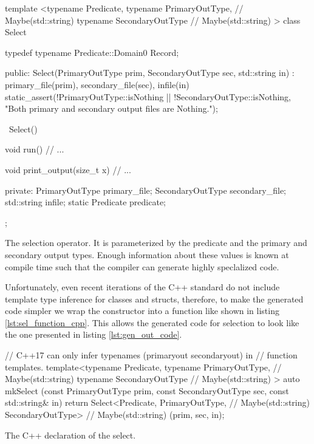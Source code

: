 \begin{code}
\begin{cppcode}
template <typename Predicate,
          typename PrimaryOutType,   // Maybe(std::string)
          typename SecondaryOutType  // Maybe(std::string)
          >
class Select {
  typedef typename Predicate::Domain0 Record;

public:
  Select(PrimaryOutType prim, SecondaryOutType sec, std::string in)
    : primary_file(prim), secondary_file(sec), infile(in) {
    static_assert(!PrimaryOutType::isNothing || !SecondaryOutType::isNothing,
                  "Both primary and secondary output files are Nothing.");
  }

  ~Select() {}

  void run() {
    // ...
  }

  void print_output(size_t x) {
    // ...
  }

private:
  PrimaryOutType primary_file;
  SecondaryOutType secondary_file;
  std::string infile;
  static Predicate predicate;
};
\end{cppcode}
  \caption{\label{lst:sel_operator_cpp}The selection operator. It is
    parameterized by the predicate and the primary and secondary
    output types. Enough information about these values is known at
    compile time such that the compiler can generate highly
    speclalized code.}
\end{code}

Unfortunately, even recent iterations of the C++ standard do not
include template type inference for classes and structs, therefore, to
make the generated code simpler we wrap the constructor into a
function like shown in listing \ref{lst:sel_function_cpp}. This allows the
generated code for selection to look like the one presented in listing
\ref{lst:gen_out_code}.

\begin{code}
\begin{cppcode}
// C++17 can only infer typenames (primaryout secondaryout) in
// function templates.
template<typename Predicate,
         typename PrimaryOutType,   // Maybe(std::string)
         typename SecondaryOutType  // Maybe(std::string)
         >
auto mkSelect (const PrimaryOutType prim,
               const SecondaryOutType sec,
               const std::string& in) {
  return Select<Predicate,
                PrimaryOutType,   // Maybe(std::string)
                SecondaryOutType> // Maybe(std::string)
    (prim, sec, in);
}
\end{cppcode}
\caption{\label{lst:sel_function_cpp}The C++ declaration of the select.}
\end{code}



